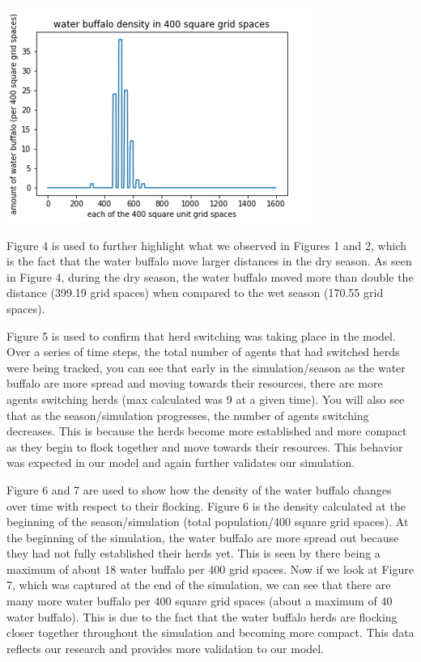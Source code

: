 \documentclass[12pt]{article}
\begin{document}
\begin{center}
\includegraphics[scale=.6]{figure7.png}%
\label{labelname}%
\end{center}

Figure 4 is used to further highlight what we observed in Figures 1 and 2, which is the fact that the water buffalo move larger distances in the dry season. As seen in Figure 4, during the dry season, the water buffalo moved more than double the distance (399.19 grid spaces) when compared to the wet season (170.55 grid spaces).

Figure 5 is used to confirm that herd switching was taking place in the model. Over a series of time steps, the total number of agents that had switched herds were being tracked, you can see that early in the simulation/season as the water buffalo are more spread and moving towards their resources, there are more agents switching herds (max calculated was 9 at a given time). You will also see that as the season/simulation progresses, the number of agents switching decreases. This is because the herds become more established and more compact as they begin to flock together and move towards their resources. This behavior was expected in our model and again further validates our simulation.

Figure 6 and 7 are used to show how the density of the water buffalo changes over time with respect to their flocking. Figure 6 is the density calculated at the beginning of the season/simulation (total population/400 square grid spaces). At the beginning of the simulation, the water buffalo are more spread out because they had not fully established their herds yet. This is seen by there being a maximum of about 18 water buffalo per 400 grid spaces. Now if we look at Figure 7, which was captured at the end of the simulation, we can see that there are many more water buffalo per 400 square grid spaces (about a maximum of 40 water buffalo). This is due to the fact that the water buffalo herds are flocking closer together throughout the simulation and becoming more compact. This data reflects our research and provides more validation to our model.
\end{document}
